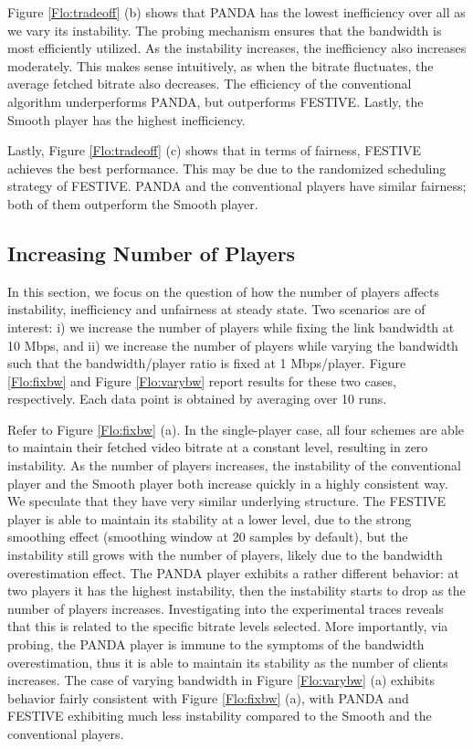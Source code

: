 \documentclass[conference]{IEEEtran}
\theoremstyle{plain}
\theoremstyle{definition}
\theoremstyle{plain}
\theoremstyle{plain}
\begin{document}
Figure \ref{Flo:tradeoff} (b) shows that PANDA has the lowest inefficiency
over all as we vary its instability. The probing mechanism ensures
that the bandwidth is most efficiently utilized. As the instability
increases, the inefficiency also increases moderately. This makes
sense intuitively, as when the bitrate fluctuates, the average fetched
bitrate also decreases. The efficiency of the conventional algorithm
underperforms PANDA, but outperforms FESTIVE. Lastly, the Smooth player
has the highest inefficiency.

Lastly, Figure \ref{Flo:tradeoff} (c) shows that in terms of fairness,
FESTIVE achieves the best performance. This may be due to the randomized
scheduling strategy of FESTIVE. PANDA and the conventional players
have similar fairness; both of them outperform the Smooth player. 


\subsection{Increasing Number of Players}

In this section, we focus on the question of how the number of players
affects instability, inefficiency and unfairness at steady state.
Two scenarios are of interest: i) we increase the number of players
while fixing the link bandwidth at 10 Mbps, and ii) we increase the
number of players while varying the bandwidth such that the bandwidth/player
ratio is fixed at 1 Mbps/player. Figure \ref{Flo:fixbw} and Figure
\ref{Flo:varybw} report results for these two cases, respectively.
Each data point is obtained by averaging over 10 runs.

Refer to Figure \ref{Flo:fixbw} (a). In the single-player case, all
four schemes are able to maintain their fetched video bitrate at a
constant level, resulting in zero instability. As the number of players
increases, the instability of the conventional player and the Smooth
player both increase quickly in a highly consistent way. We speculate
that they have very similar underlying structure. The FESTIVE player
is able to maintain its stability at a lower level, due to the strong
smoothing effect (smoothing window at 20 samples by default), but
the instability still grows with the number of players, likely due
to the bandwidth overestimation effect. The PANDA player exhibits
a rather different behavior: at two players it has the highest instability,
then the instability starts to drop as the number of players increases.
Investigating into the experimental traces reveals that this is related
to the specific bitrate levels selected. More importantly, via probing,
the PANDA player is immune to the symptoms of the bandwidth overestimation,
thus it is able to maintain its stability as the number of clients
increases. The case of varying bandwidth in Figure \ref{Flo:varybw}
(a) exhibits behavior fairly consistent with Figure \ref{Flo:fixbw}
(a), with PANDA and FESTIVE exhibiting much less instability compared
to the Smooth and the conventional players.
\end{document}
